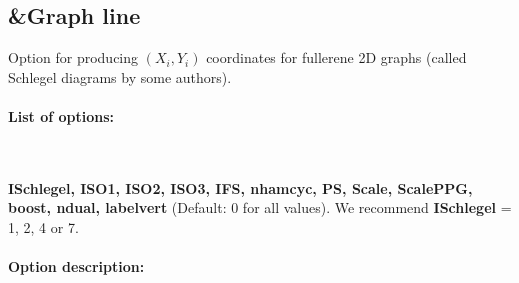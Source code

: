\documentclass[article,a4paper,twoside]{memoir}
\newcommand{\paramname}[1]{{\color{green}\textbf{#1}}}
\begin{document}
\subsection{\&Graph line}
 Option for producing $(X_i, Y_i)$ coordinates for fullerene 2D graphs (called Schlegel diagrams by some authors).
\paragraph{List of options:}\ 

 \paramname{ISchlegel, ISO1, ISO2, ISO3, IFS, nhamcyc, PS, Scale, ScalePPG, boost, ndual, labelvert} (Default: 0 for all values). We recommend \paramname{ISchlegel} = 1, 2, 4 or 7.


\paragraph{Option description:}
\end{document}
